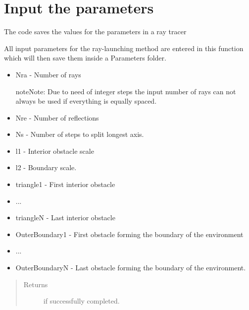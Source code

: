 \documentclass[letterpaper,10pt,english]{sphinxmanual}
\begin{document}
\chapter{Input the parameters}
\label{index:module-ParameterInput}\label{index:input-the-parameters}
The code saves the values for the parameters in a ray tracer

\begin{fulllineitems}
\label{index:ParameterInput.DeclareParameters}
All input parameters for the ray-launching method are entered in
this function which will then save them inside a Parameters folder.
\begin{itemize}
\item {} 
Nra - Number of rays

\begin{notice}{note}{Note:}
Due to need of integer steps the input number of rays can not
always be used if everything is equally spaced.
\end{notice}

\item {} 
Nre - Number of reflections

\item {} 
Ns - Number of steps to split longest axis.

\item {} 
l1 - Interior obstacle scale

\item {} 
l2 - Boundary scale.

\item {} 
triangle1 - First interior obstacle

\item {} 
...

\item {} 
triangleN - Last interior obstacle

\item {} 
OuterBoundary1 - First obstacle forming the boundary of the   environment

\item {} 
...

\item {} 
OuterBoundaryN - Last obstacle forming the boundary of the   environment.

\end{itemize}
\begin{quote}\begin{description}
\item[{Returns}]  if successfully completed.

\end{description}\end{quote}

\end{fulllineitems}
\end{document}

